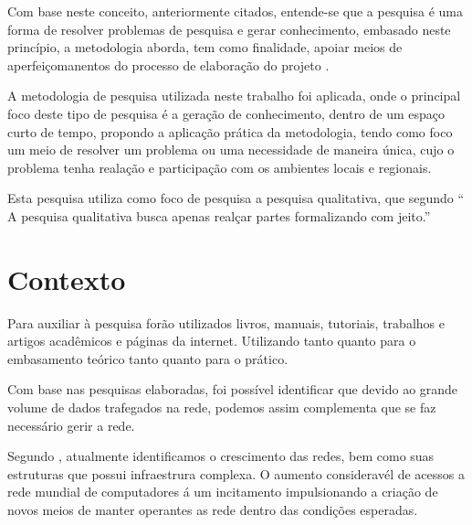 \par Com base neste conceito, anteriormente citados, entende-se que a pesquisa é uma forma
de resolver problemas de pesquisa e gerar conhecimento, embasado neste princípio, a metodologia
aborda, tem como finalidade, apoiar meios de aperfeiçomanentos
do processo de elaboração do projeto .
%


\par A metodologia de pesquisa utilizada neste trabalho foi aplicada, onde o
principal foco deste tipo de pesquisa é a geração de conhecimento, dentro de um
espaço curto de tempo, propondo a aplicação prática da metodologia, tendo como
foco um meio de resolver um problema ou uma necessidade de maneira única, cujo o
problema tenha realação e participação com os ambientes locais e regionais.

\par Esta pesquisa utiliza como foco de pesquisa a pesquisa qualitativa, que
segundo  `` A pesquisa qualitativa busca apenas
realçar partes formalizando com jeito.''





\section{Contexto}

\par Para auxiliar à pesquisa forão utilizados livros, manuais, tutoriais,
trabalhos e artigos acadêmicos e páginas da internet. Utilizando tanto quanto 
para o embasamento teórico tanto quanto para o prático.

\par Com base nas pesquisas elaboradas, foi possível identificar que devido ao
grande volume de dados trafegados na rede, podemos assim complementa que se faz necessário gerir a rede.

\par Segundo , atualmente identificamos o crescimento das redes, bem como
suas estruturas que possui infraestrura complexa. O aumento consideravél de acessos a rede
mundial de computadores á um incitamento impulsionando a criação de novos meios de manter
operantes as rede dentro das condições esperadas.

